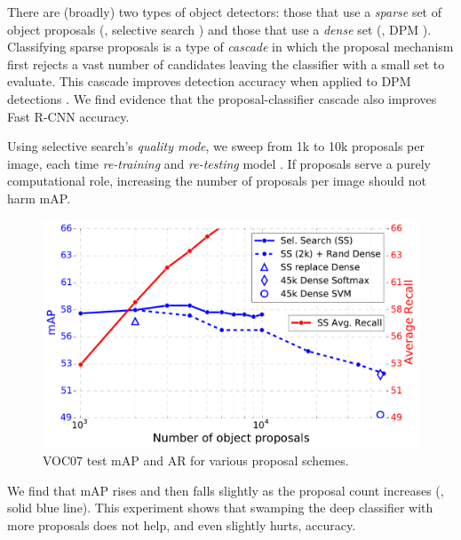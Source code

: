 
There are (broadly) two types of object detectors: those that use a \emph{sparse} set of object proposals (\eg, selective search \cite{UijlingsIJCV2013}) and those that use a \emph{dense} set (\eg, DPM \cite{lsvm-pami}).
Classifying sparse proposals is a type of \emph{cascade} \cite{Viola01} in which the proposal mechanism first rejects a vast number of candidates leaving the classifier with a small set to evaluate.
This cascade improves detection accuracy when applied to DPM detections \cite{UijlingsIJCV2013}.
We find evidence that the proposal-classifier cascade also improves Fast R-CNN accuracy.

Using selective search's \emph{quality mode}, we sweep from 1k to 10k proposals per image, each time \emph{re-training} and \emph{re-testing} model \Med.
If proposals serve a purely computational role, increasing the number of proposals per image should not harm mAP.
\begin{figure}[h!]
\centering
\includegraphics[width=1\linewidth,trim=0em 0em 0 0, clip]{figs/proposals.pdf}
\caption{VOC07 test mAP and AR for various proposal schemes.}
\end{figure}

We find that  mAP rises and then falls slightly as the proposal count increases (, solid blue line).
This experiment shows that swamping the deep classifier with more proposals does not help, and even slightly hurts, accuracy.

